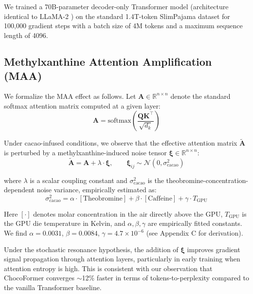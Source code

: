 \documentclass[11pt,a4paper]{article}
\begin{document}
We trained a 70B-parameter decoder-only Transformer model (architecture identical to LLaMA-2 \citep{touvron2023llama2}) on the standard 1.4T-token SlimPajama dataset \citep{cerebras2023slimpajama} for 100,000 gradient steps with a batch size of 4M tokens and a maximum sequence length of 4096.

\subsection{Methylxanthine Attention Amplification (MAA)}

We formalize the MAA effect as follows. Let $\mathbf{A} \in \mathbb{R}^{n \times n}$ denote the standard softmax attention matrix computed at a given layer:
\begin{equation}
    \mathbf{A} = \text{softmax}\!\left(\frac{\mathbf{Q}\mathbf{K}^\top}{\sqrt{d_k}}\right)
\end{equation}

Under cacao-infused conditions, we observe that the effective attention matrix $\tilde{\mathbf{A}}$ is perturbed by a methylxanthine-induced noise tensor $\boldsymbol{\xi} \in \mathbb{R}^{n \times n}$:
\begin{equation}
    \tilde{\mathbf{A}} = \mathbf{A} + \lambda \cdot \boldsymbol{\xi}, \qquad \boldsymbol{\xi}_{ij} \sim \mathcal{N}(0, \sigma^2_{\text{cacao}})
\end{equation}

where $\lambda$ is a scalar coupling constant and $\sigma^2_{\text{cacao}}$ is the theobromine-concentration-dependent noise variance, empirically estimated as:
\begin{equation}
    \sigma^2_{\text{cacao}} = \alpha \cdot [\text{Theobromine}] + \beta \cdot [\text{Caffeine}] + \gamma \cdot T_{\text{GPU}}
\end{equation}

Here $[\cdot]$ denotes molar concentration in the air directly above the GPU, $T_{\text{GPU}}$ is the GPU die temperature in Kelvin, and $\alpha, \beta, \gamma$ are empirically fitted constants. We find $\alpha = 0.0031$, $\beta = 0.0084$, $\gamma = 4.7 \times 10^{-6}$ (see Appendix C for derivation).

Under the stochastic resonance hypothesis, the addition of $\boldsymbol{\xi}$ improves gradient signal propagation through attention layers, particularly in early training when attention entropy is high. This is consistent with our observation that ChocoFormer converges $\sim$12\% faster in terms of tokens-to-perplexity compared to the vanilla Transformer baseline.
\end{document}
